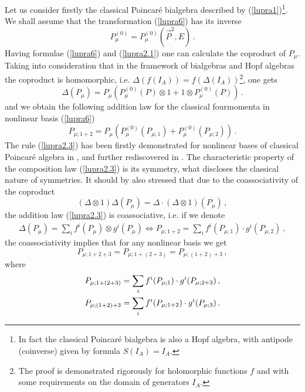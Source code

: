 \documentclass[a4paper,a4paper]{article}
\begin{document}
Let us consider firstly the classical    Poincar\'{e}  bialgebra
described by (\ref{lupra1})\footnote{In fact the classical
Poincar\'{e}  bialgebra is also a Hopf algebra, with antipode
(coinverse) given by formula $S(I_A) = I_A$.}. We shall assume
that the transformation (\ref{lupra6}) has its inverse
\begin{equation}\label{lupra2.1}
  P^{(0)}_\mu = P^{(0)}_\mu ( \overrightarrow{P}^2 , E )\, .
\end{equation}
Having formulae (\ref{lupra6}) and (\ref{lupra2.1}) one can
calculate the coproduct of $P_\mu$. Taking into consideration that
in the framework of bialgebras and Hopf algebras the coproduct is
homomorphic, i.e. $\Delta(f(I_A))= f(\Delta (I_A))$\footnote{The
proof is demonstrated rigorously for holomorphic functions $f$ and
with some requirements on the domain of generators $I_A$.}, one
gets
\begin{equation}\label{lupra2.2}
  \Delta( P_\mu ) = P_\mu    (P^{(0)}_\mu (P)\otimes 1 + 1 \otimes
  P^{(0)}_\mu (P))\, .
\end{equation}
and we obtain the following addition law for the classical
fourmomenta in nonlinear basis (\ref{lupra6})
\begin{equation}\label{lupra2.3}
  P_{\mu;1+2} = P_\mu (P^{(0)}_\mu (P_{\mu;1}) + P^{(0)}_\mu
  (P_{\mu;2}))\, .
\end{equation}
The rule (\ref{lupra2.3}) has been firstly demonstrated for
nonlinear bases of classical Poincar\'{e} algebra in  \cite{ln2},
and further rediscovered in \cite{jv}. The characteristic property
of the composition law (\ref{lupra2.3}) is its symmetry, what
discloses the classical nature of symmetries. It should by also
stressed that due to the  coassociativity  of the coproduct
\begin{equation}\label{lupra2.4}
  (\Delta \otimes 1) \Delta(P_{\mu}) = \Delta \cdot (\Delta
  \otimes 1)(P_\mu )\, ,
\end{equation}
the addition law (\ref{lupra2.3}) is coassociative, i.e. if we
denote \cite{ss1}
\begin{eqnarray*}
  \Delta(P_\mu) = \sum\limits_{i} f^i (P_\mu)  \otimes g^i 
(P_\mu)\Longleftrightarrow
  P_{\mu;1 +2} = \sum\limits_{i} f^{i} (P_{\mu;1}) \cdot g^i
  (P_{\mu;2})\, ,
\end{eqnarray*}
the coassociativity implies that for any nonlinear basis we get
\begin{equation}\label{lupra2.5}
  P_{\mu;1+2+3}= P_{\mu;1+(2+3)} = P_{\mu;(1+2)+3}\, ,
\end{equation}
where
\begin{eqnarray}\label{lupra2.6}
  P_{\mu;1+(2+3)} = \sum\limits_{i} f^i (P_{\mu;1}) \cdot g^i
  (P_{\mu;2+3})\, ,
  \cr
   P_{\mu;(1+2)+3} = \sum\limits_{i} f^i (P_{\mu;1+2}) \cdot g^i
  (P_{\mu;3})\, .
\end{eqnarray}
\end{document}
